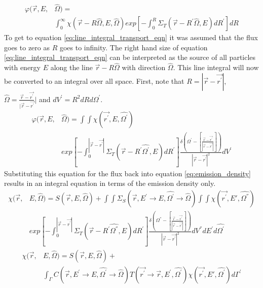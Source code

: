 \begin{equation}
  \begin{split}
    \varphi(\vec{r},E,&\hat{\Omega}) = \\ 
    & \int_0^{\infty} \chi(\vec{r} - R\hat{\Omega},E,\hat{\Omega})
    exp\left[-\int_0^R \Sigma_T(\vec{r}-R^{'}\hat{\Omega},E)dR^{'} \right] dR
  \end{split}
  \label{eq:line_integral_transport_eqn}
\end{equation}
To get to equation \ref{eq:line_integral_transport_eqn} it was assumed that the
flux goes to zero as $R$ goes to infinity. The right hand size of equation 
\ref{eq:line_integral_transport_eqn} can be interpreted as the source of all
particles with energy $E$ along the line $\vec{r}-R\hat{\Omega}$ with direction
$\hat{\Omega}$. This line integral will now be converted to an integral over 
all space. First, note that $R = |\vec{r} - \vec{r^{'}}|$,
$\hat{\Omega} = \frac{\vec{r} - \vec{r^{'}}}{|\vec{r} - \vec{r^{'}}}|$ and
$dV^{'} = R^2dRd\hat{\Omega^{'}}$.
\begin{equation}
  \begin{split}
    \varphi(\vec{r},E,&\hat{\Omega}) = 
    \int\int \chi(\vec{r^{'}},E,\hat{\Omega^{'}}) \\
    & exp\left[-\int_0^{|\vec{r} - \vec{r^{'}}|} 
      \Sigma_T(\vec{r}-R^{'}\hat{\Omega^{'}},E)dR^{'} \right] 
    \frac{\delta \left(\Omega^{'} - \left[\frac{\vec{r} - \vec{r^{'}}}
        {|\vec{r} - \vec{r^{'}}|}\right]\right)}
    {|\vec{r} - \vec{r^{'}}|^2} dV^{'}
  \end{split}
  \label{eq:volume_integral_transport_eqn}
\end{equation}
Substituting this equation for the flux back into equation 
\ref{eq:emission_density} results in an integral equation in terms of the 
emission density only. 
\begin{equation*}
  \begin{split}
    \chi(\vec{r},&E,\hat{\Omega}) = S(\vec{r},E,\hat{\Omega}) +
    \int\int \Sigma_S(\vec{r},E^{'} \to E, \hat{\Omega^{'}} \to \hat{\Omega})
    \int\int \chi(\vec{r^{'}},E',\hat{\Omega^{''}}) \\
    & exp\left[-\int_0^{|\vec{r} - \vec{r^{'}}|} 
      \Sigma_T(\vec{r}-R^{'}\hat{\Omega^{''}},E)dR^{'} \right]
    \frac{\delta \left(\Omega^{''} - \left[\frac{\vec{r} - \vec{r^{'}}}
        {|\vec{r} - \vec{r^{'}}|}\right]\right)}
    {|\vec{r} - \vec{r^{'}}|^2} dV^{''}dE^{'}d\hat{\Omega^{'}}
  \end{split}
\end{equation*}
\begin{equation}
  \begin{split}
    \chi(\vec{r},&E,\hat{\Omega}) = S(\vec{r},E,\hat{\Omega}) + \\
    &\int_{\Gamma}C(\vec{r},E^{'} \to E,\hat{\Omega^{'}} \to \hat{\Omega})
    T(\vec{r^{'}} \to \vec{r},E^{'},\hat{\Omega^{'}}) 
    \chi(\vec{r^{'}},E',\hat{\Omega^{'}}) d\Gamma^{'}
  \end{split}
  \label{eq:emission_density_integral_eqn}
\end{equation}

